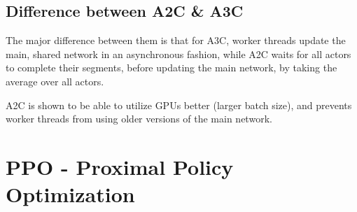 \documentclass[12pt]{article} %
\begin{document}
\subsection{Difference between A2C \& A3C}
The major difference between them is that for A3C, worker threads update the main, shared network in an asynchronous fashion, while A2C waits for all actors to complete their segments, before updating the main network, by taking the average over all actors.

A2C is shown to be able to utilize GPUs better (larger batch size), and prevents worker threads from using older versions of the main network.

\section{PPO - Proximal Policy Optimization}
\end{document}
